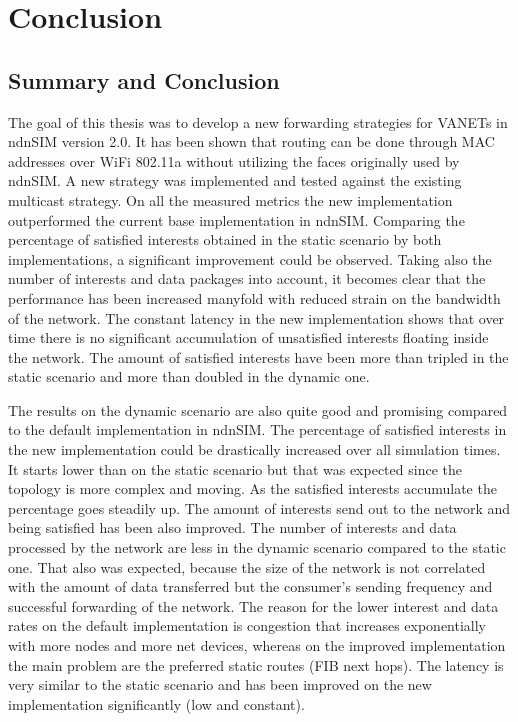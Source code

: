 \chapter{Conclusion}


\section{Summary and Conclusion}

The goal of this thesis was to develop a new forwarding strategies for VANETs in ndnSIM version 2.0. It has been shown that routing can be done through MAC addresses over WiFi 802.11a without utilizing the faces originally used by ndnSIM. A new strategy was implemented and tested against the existing multicast strategy. On all the measured metrics the new implementation outperformed the current base implementation in ndnSIM.
Comparing the percentage of satisfied interests obtained in the static scenario by both implementations, a significant improvement could be observed. Taking also the number of interests and data packages into account, it becomes clear that the performance has been increased manyfold with reduced strain on the bandwidth of the network. The constant latency in the new implementation shows that over time there is no significant accumulation of unsatisfied interests floating inside the network. The amount of satisfied interests have been more than tripled in the static scenario and more than doubled in the dynamic one.

\vspace{5mm} %

The results on the dynamic scenario are also quite good and promising compared to the default implementation in ndnSIM. The percentage of satisfied interests in the new implementation could be drastically increased over all simulation times. It starts lower than on the static scenario but that was expected since the topology is more complex and moving. As the satisfied interests accumulate the percentage goes steadily up. The amount of interests send out to the network and being satisfied has been also improved. The number of interests and data processed by the network are less in the dynamic scenario compared to the static one. That also was expected, because the size of the network is not correlated with the amount of data transferred but the consumer's sending frequency and successful forwarding of the network. The reason for the lower interest and data rates on the default implementation is congestion that increases exponentially with more nodes and more net devices, whereas on the improved implementation the main problem are the preferred static routes (FIB next hops). The latency is very similar to the static scenario and has been improved on the new implementation significantly (low and constant).

